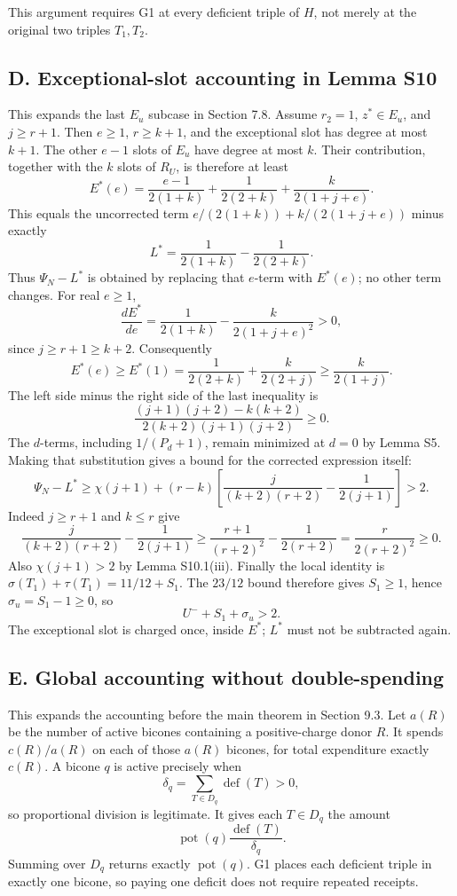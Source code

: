 This argument requires G1 at every deficient triple of $H$, not merely at the original two triples $T_1,T_2$.

\subsection*{D. Exceptional-slot accounting in Lemma S10}
This expands the last $E_u$ subcase in Section 7.8.
Assume $r_2=1$, $z^*\in E_u$, and $j\ge r+1$. Then $e\ge1$, $r\ge k+1$, and the exceptional slot has degree at most $k+1$. The other $e-1$ slots of $E_u$ have degree at most $k$. Their contribution, together with the $k$ slots of $R_U$, is therefore at least
\[
 E^*(e)=\frac{e-1}{2(1+k)}+\frac1{2(2+k)}
                      +\frac{k}{2(1+j+e)}.
\]
This equals the uncorrected term
$e/(2(1+k))+k/(2(1+j+e))$ minus exactly
\[
 L^*=\frac1{2(1+k)}-\frac1{2(2+k)}.
\]
Thus $\Psi_N-L^*$ is obtained by replacing that $e$-term with $E^*(e)$; no other term changes. For real $e\ge1$,
\[
 \frac{dE^*}{de}=\frac1{2(1+k)}-\frac{k}{2(1+j+e)^2}>0,
\]
since $j\ge r+1\ge k+2$. Consequently
\[
 E^*(e)\ge E^*(1)=\frac1{2(2+k)}+\frac{k}{2(2+j)}
                     \ge\frac{k}{2(1+j)}.
\]
The left side minus the right side of the last inequality is
\[
 \frac{(j+1)(j+2)-k(k+2)}{2(k+2)(j+1)(j+2)}\ge0.
\]
The $d$-terms, including $1/(P_d+1)$, remain minimized at $d=0$ by Lemma S5. Making that substitution gives a bound for the corrected expression itself:
\[
 \Psi_N-L^*\ge\chi(j+1)+(r-k)
 \left[\frac{j}{(k+2)(r+2)}-\frac1{2(j+1)}\right]>2.
\]
Indeed $j\ge r+1$ and $k\le r$ give
\[
 \frac{j}{(k+2)(r+2)}-\frac1{2(j+1)}
 \ge\frac{r+1}{(r+2)^2}-\frac1{2(r+2)}
 =\frac{r}{2(r+2)^2}\ge0.
\]
Also $\chi(j+1)>2$ by Lemma S10.1(iii).
Finally the local identity is $\sigma(T_1)+\tau(T_1)=11/12+S_1$. The $23/12$ bound therefore gives $S_1\ge1$, hence $\sigma_u=S_1-1\ge0$, so
\[
 U^-+S_1+\sigma_u>2.
\]
The exceptional slot is charged once, inside $E^*$; $L^*$ must not be subtracted again.

\subsection*{E. Global accounting without double-spending}
This expands the accounting before the main theorem in Section 9.3.
Let $a(R)$ be the number of active bicones containing a positive-charge donor $R$. It spends $c(R)/a(R)$ on each of those $a(R)$ bicones, for total expenditure exactly $c(R)$. A bicone $q$ is active precisely when
\[
 \delta_q=\sum_{T\in D_q}\operatorname{def}(T)>0,
\]
so proportional division is legitimate. It gives each $T\in D_q$ the amount
\[
 \operatorname{pot}(q)\frac{\operatorname{def}(T)}{\delta_q}.
\]
Summing over $D_q$ returns exactly $\operatorname{pot}(q)$. G1 places each deficient triple in exactly one bicone, so paying one deficit does not require repeated receipts.

